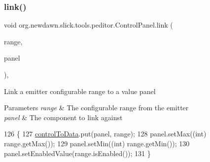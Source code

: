 \subsubsection{\texorpdfstring{link()}{link()}\hspace{0.1cm}{\footnotesize\ttfamily [4/4]}}
{\footnotesize\ttfamily void org.\+newdawn.\+slick.\+tools.\+peditor.\+Control\+Panel.\+link (\begin{DoxyParamCaption}\item[{\mbox{\hyperlink{classorg_1_1newdawn_1_1slick_1_1particles_1_1_configurable_emitter_1_1_range}{Range}}}]{range,  }\item[{\mbox{\hyperlink{classorg_1_1newdawn_1_1slick_1_1tools_1_1peditor_1_1_min_max_panel}{Min\+Max\+Panel}}}]{panel }\end{DoxyParamCaption})\hspace{0.3cm}{\ttfamily [inline]}, {\ttfamily [private]}}

Link a emitter configurable range to a value panel


\begin{DoxyParams}{Parameters}
{\em range} & The configurable range from the emitter \\
\hline
{\em panel} & The component to link against \\
\hline
\end{DoxyParams}

\begin{DoxyCode}
126                                                       \{
127         \mbox{\hyperlink{classorg_1_1newdawn_1_1slick_1_1tools_1_1peditor_1_1_control_panel_a7316bd7b85c2e289dbafe9b65e33a474}{controlToData}}.put(panel, range);
128         panel.setMax((\textcolor{keywordtype}{int}) range.getMax());
129         panel.setMin((\textcolor{keywordtype}{int}) range.getMin());
130         panel.setEnabledValue(range.isEnabled());
131     \}
\end{DoxyCode}
\mbox{\label{classorg_1_1newdawn_1_1slick_1_1tools_1_1peditor_1_1_control_panel_a55fa468548caadc265ea28c5f3214a20}} 
